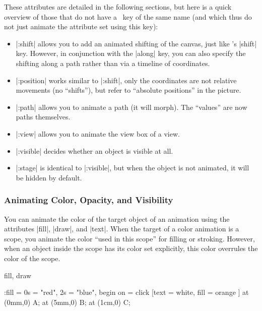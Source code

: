 These attributes are detailed in the following sections, but here is a quick
overview of those that do not have a \tikzname\ key of the same name (and which
thus do not just animate the attribute set using this key):
%
\begin{itemize}
    \item |:shift| allows you to add an animated shifting of the canvas, just
        like \tikzname's |shift| key. However, in conjunction with the |along|
        key, you can also specify the shifting along a path rather than via a
        timeline of coordinates.
    \item |:position| works similar to |:shift|, only the coordinates are not
        relative movements (no ``shifts''), but refer to ``absolute positions''
        in the picture.
    \item |:path| allows you to animate a path (it will morph). The ``values''
        are now paths themselves.
    \item |:view| allows you to animate the view box of a view.
    \item |:visible| decides whether  an object is visible at all.
    \item |:stage| is identical to |:visible|, but when the object is not
        animated, it will be hidden by default.
\end{itemize}


\subsubsection{Animating Color, Opacity, and Visibility}
\label{section-animation-painting}

You can animate the color of the target object of an animation using the
attributes |fill|, |draw|, and |text|. When the target of a color animation is
a scope, you animate the color ``used in this scope'' for filling or stroking.
However, when an object inside the scope has its color set explicitly, this
color overrules the color of the scope.

\begin{tikzanimateattribute}{fill, draw}
\begin{codeexample}[imagesource={standalone/pgfmanual-en-tikz-animations-animation-20.svg}]
\tikz :fill = {0s = "red", 2s = "blue", begin on = click}
      [text = white, fill = orange ] {
  \node [fill]                   at (0mm,0) {A};
  \node [fill]                   at (5mm,0) {B};
  \node [fill = green!50!black ] at (1cm,0) {C};
}
\end{codeexample}
\end{tikzanimateattribute}

